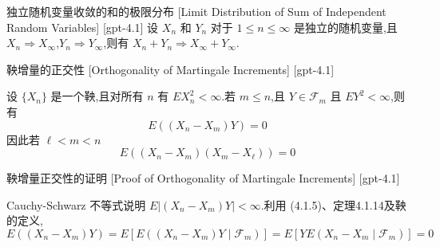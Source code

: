 \documentclass[UTF8]{ctexart}
\begin{document}
    
    
    \begin{thm}
        {独立随机变量收敛的和的极限分布}
        [Limit Distribution of Sum of Independent Random Variables]
        [gpt-4.1]
        设 $X_n$ 和 $Y_n$ 对于 $1 \leq n \leq \infty$ 是独立的随机变量,且 $X_n \Rightarrow X_\infty$,$Y_n \Rightarrow Y_\infty$,则有 $X_n + Y_n \Rightarrow X_\infty + Y_\infty$.
    \end{thm}
    
    
    
    \begin{thm}
        {鞅增量的正交性}
        [Orthogonality of Martingale Increments]
        [gpt-4.1]
        
设 $\{X_n\}$ 是一个鞅,且对所有 $n$ 有 $E X_n^2 < \infty$.若 $m \leq n$,且 $Y \in \mathcal{F}_m$ 且 $E Y^2 < \infty$,则有
\[
E \left( (X_n - X_m) Y \right) = 0
\]
因此若 $\ell < m < n$
\[
E \left( (X_n - X_m)(X_m - X_\ell) \right) = 0
\]

    \end{thm}
    
    
    
    \begin{prf}
        {鞅增量正交性的证明}
        [Proof of Orthogonality of Martingale Increments]
        [gpt-4.1]
        
Cauchy-Schwarz 不等式说明 $E | (X_n - X_m) Y | < \infty$.利用 (4.1.5)、定理4.1.14及鞅的定义,
\[
E \left( (X_n - X_m) Y \right) = E \left[ E \left( (X_n - X_m) Y \mid \mathcal{F}_m \right) \right] = E \left[ Y E \left( X_n - X_m \mid \mathcal{F}_m \right) \right] = 0
\]

    \end{prf}
    
    
    
\end{document}
